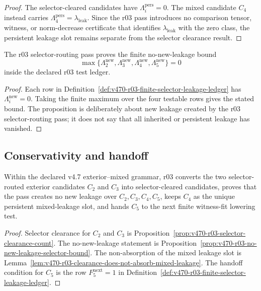 \begin{proof}
The selector-cleared candidates have \(\Lambda_i^{\mathrm{pers}}=0\).  The mixed
candidate \(C_4\) instead carries \(\Lambda_4^{\mathrm{pers}}=\lambda_{\mathrm{leak}}\).
Since the r03 pass introduces no comparison tensor, witness, or norm-decrease
certificate that identifies \(\lambda_{\mathrm{leak}}\) with the zero class, the
persistent leakage slot remains separate from the selector clearance result.
\end{proof}

\begin{proposition}
\label{prop:v470-r03-no-new-leakage-selector-bound}
The r03 selector-routing pass proves the finite no-new-leakage bound
\[
\max\{\Lambda_2^{\mathrm{new}},\Lambda_3^{\mathrm{new}},
\Lambda_4^{\mathrm{new}},\Lambda_5^{\mathrm{new}}\}=0
\]
inside the declared r03 test ledger.
\end{proposition}

\begin{proof}
Each row in Definition~\ref{def:v470-r03-finite-selector-leakage-ledger} has
\(\Lambda_i^{\mathrm{new}}=0\).  Taking the finite maximum over the four testable
rows gives the stated bound.  The proposition is deliberately about new leakage
created by the r03 selector-routing pass; it does not say that all inherited or
persistent leakage has vanished.
\end{proof}

\subsection{Conservativity and handoff}
\label{subsec:v470-r03-conservativity-handoff}

\begin{theorem}
\label{thm:v470-r03-conservative-selector-leakage-bound-theorem}
Within the declared v4.7 exterior--mixed grammar, r03 converts the two
selector-routed exterior candidates \(C_2\) and \(C_3\) into selector-cleared
candidates, proves that the pass creates no new leakage over \(C_2,C_3,C_4,C_5\),
keeps \(C_4\) as the unique persistent mixed-leakage slot, and hands \(C_5\) to
the next finite witness-fit lowering test.
\end{theorem}

\begin{proof}
Selector clearance for \(C_2\) and \(C_3\) is Proposition~\ref{prop:v470-r03-selector-clearance-count}.
The no-new-leakage statement is Proposition~\ref{prop:v470-r03-no-new-leakage-selector-bound}.
The non-absorption of the mixed leakage slot is Lemma~\ref{lem:v470-r03-clearance-does-not-absorb-mixed-leakage}.
The handoff condition for \(C_5\) is the row \(F_5^{\mathrm{next}}=1\) in
Definition~\ref{def:v470-r03-finite-selector-leakage-ledger}.
\end{proof}

